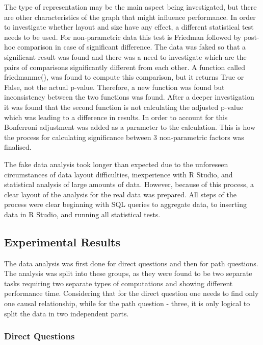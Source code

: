 \documentclass{l4proj}
\begin{document}
The type of representation may be the main aspect being investigated, but there are other characteristics of the graph that might influence performance. In order to investigate whether layout and size have any effect, a different statistical test needs to be used. For non-parametric data this test is Friedman followed by post-hoc comparison in case of significant difference. The data was faked so that a significant result was found and there was a need to investigate which are the pairs of comparisons significantly different from each other. A function called friedmanmc(), was found to compute this comparison, but it returns True or False, not the actual p-value. Therefore, a new function was found but inconsistency between the two functions was found. After a deeper investigation it was found that the second function is not calculating the adjusted p-value which was leading to a difference in results. In order to account for this Bonferroni adjustment was added as a parameter to the calculation. This is how the process for calculating significance between 3  non-parametric factors was finalised. 

The fake data analysis took longer than expected due to the unforeseen circumstances of data layout difficulties, inexperience with R Studio, and statistical analysis of large amounts of data. However, because of this process, a clear layout of the analysis for the real data was prepared. All steps of the process were clear beginning with SQL queries to aggregate data, to inserting data in R Studio, and running all statistical tests.

\subsection{Experimental Results}

The data analysis was first done for direct questions and then for path questions. The analysis was split into these groups, as they were found to be two separate tasks requiring two separate types of computations and showing different performance time. Considering that for the direct question one needs to find only one causal relationship, while for the path question - three, it is only logical to split the data in two independent parts.

\subsubsection{Direct Questions}
\end{document}
